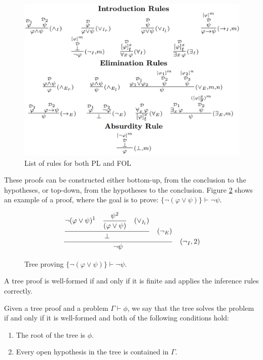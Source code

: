 \documentclass[runningheads]{llncs}
\begin{document}
\begin{figure}
    \centering
    \includegraphics[width=1\linewidth]{resources/rules.png}
    \caption{List of rules for both PL and FOL}
    \label{fig:nd-rules}
\end{figure}

These proofs can be constructed either bottom-up, from the conclusion to the hypotheses, or top-down, from the hypotheses to the conclusion. Figure \ref{tab:proof-tree} shows an example of a proof, where the goal is to prove: \( \{\neg (\varphi \lor \psi)\} \vdash \neg \psi \).

\begin{figure}
    \centering
    \[
    \frac{\displaystyle \frac{
    \displaystyle \neg (\varphi \lor \psi)^1 \quad \displaystyle \frac{\psi^2}{(\varphi \lor \psi) \strut} \quad (\lor_{I_l}) \strut}
    {\displaystyle \bot \strut} \quad (\displaystyle \neg_E)\strut} {\displaystyle \neg \psi \strut} \quad (\neg_I, 2)
    \]
    \caption{Tree proving \( \{\neg (\varphi \lor \psi)\} \vdash \neg \psi \).}
    \label{tab:proof-tree}
\end{figure}


\begin{definition}
A tree proof is well-formed if and only if it is finite and applies the inference rules correctly.
\end{definition}

\begin{definition}
Given a tree proof and a problem \(\Gamma \vdash \phi\), we say that the tree solves the problem if and only if it is well-formed and both of the following conditions hold:
\begin{enumerate}
    \item The root of the tree is \(\phi\).
    \item Every open hypothesis in the tree is contained in \(\Gamma\).
\end{enumerate}
\end{definition}
\end{document}
